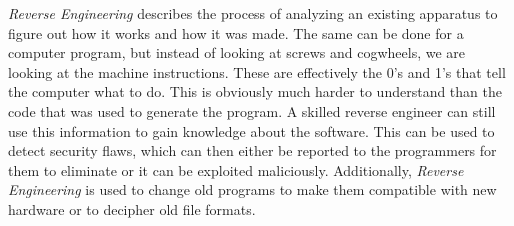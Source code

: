 
\emph{Reverse Engineering} describes the process of analyzing an existing apparatus to figure out how it works and how it was made.
The same can be done for a computer program, but instead of looking at screws and cogwheels, we are looking at the machine instructions.
These are effectively the 0's and 1's that tell the computer what to do.
This is obviously much harder to understand than the code that was used to generate the program.
A skilled reverse engineer can still use this information to gain knowledge about the software.
This can be used to detect security flaws, which can then either be reported to the programmers for them to eliminate or it can be exploited maliciously.
Additionally, \emph{Reverse Engineering} is used to change old programs to make them compatible with new hardware or to decipher old file formats.

